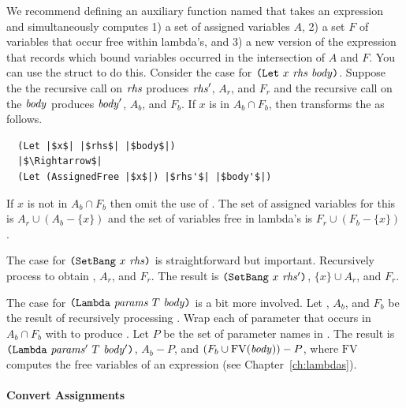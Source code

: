 \documentclass[11pt]{book}
\begin{document}
We recommend defining an auxiliary function named
 that takes an expression and simultaneously
computes 1) a set of assigned variables $A$, 2) a set $F$ of variables
that occur free within lambda's, and 3) a new version of the
expression that records which bound variables occurred in the
intersection of $A$ and $F$. You can use the struct
 to do this. Consider the case for
$\texttt{(Let}~x~\mathit{rhs}~\mathit{body}\texttt{)}$.  Suppose the the recursive call on
$\mathit{rhs}$ produces $\mathit{rhs}'$, $A_r$, and $F_r$ and the recursive
call on the $\mathit{body}$ produces $\mathit{body}'$, $A_b$, and $F_b$. If
$x$ is in $A_b\cap F_b$, then transforms the  as follows.
\begin{lstlisting}
  (Let |$x$| |$rhs$| |$body$|)
  |$\Rightarrow$|
  (Let (AssignedFree |$x$|) |$rhs'$| |$body'$|)
\end{lstlisting}
If $x$ is not in $A_b\cap F_b$ then omit the use of .
The set of assigned variables for this  is
$A_r \cup (A_b - \{x\})$
and the set of variables free in lambda's is
$F_r \cup (F_b - \{x\})$.

The case for $\texttt{(}\texttt{SetBang}~x~\mathit{rhs}\texttt{)}$ is straightforward but
important. Recursively process  to obtain , $A_r$,
and $F_r$. The result is $\texttt{(}\texttt{SetBang}~x~\mathit{rhs'}\texttt{)}$, $\{x\} \cup A_r$,
and $F_r$.

The case for $\texttt{(Lambda}~\mathit{params}~T~\mathit{body}\texttt{)}$ is a bit more
involved.  Let , $A_b$, and $F_b$ be the result of
recursively processing . Wrap each of parameter that occurs
in $A_b \cap F_b$ with  to produce .
Let $P$ be the set of parameter names in .  The result is
$\texttt{(Lambda}~\mathit{params'}~T~\mathit{body'}\texttt{)}$, $A_b - P$, and $(F_b \cup
\mathrm{FV}(\mathit{body})) - P$, where $\mathrm{FV}$ computes the free
variables of an expression (see Chapter~\ref{ch:lambdas}).

\paragraph{Convert Assignments}
\end{document}
